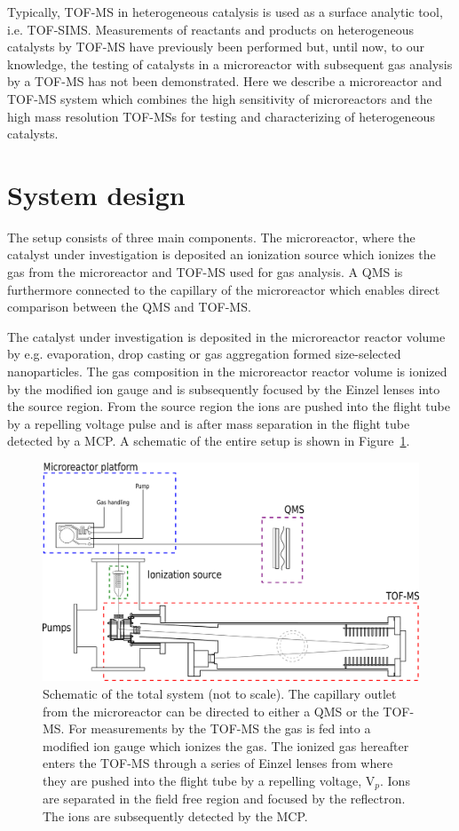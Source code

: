 \documentclass[aip,rsi]{revtex4-1}
\begin{document}
Typically, TOF-MS in heterogeneous catalysis is used as a surface analytic tool, i.e. TOF-SIMS\cite{Benninghoven1994,DeSmet1998,Grams2004,Johnson2010}. Measurements of reactants and products on heterogeneous catalysts by TOF-MS have previously been performed\cite{Levy1963,Okumura2007} but, until now, to our knowledge, the testing of catalysts in a microreactor with subsequent gas analysis by a TOF-MS has not been demonstrated. Here we describe a microreactor and TOF-MS system which combines the high sensitivity of microreactors and the high mass resolution TOF-MSs for testing and characterizing of heterogeneous catalysts.

\section{System design}
The setup consists of three main components. The microreactor, where the catalyst under investigation is deposited an ionization source which ionizes the gas from the microreactor and TOF-MS used for gas analysis. A QMS is furthermore connected to the capillary of the microreactor which enables direct comparison between the QMS and TOF-MS.

The catalyst under investigation is deposited in the microreactor reactor volume by e.g. evaporation\cite{Henriksen2009}, drop casting\cite{Vesborg2010} or gas aggregation formed size-selected nanoparticles. The gas composition in the microreactor reactor volume is ionized by the modified ion gauge  and is subsequently focused by the Einzel lenses into the source region. From the source region the ions are pushed into the flight tube by a repelling voltage pulse and is after mass separation in the flight tube detected by a MCP. A schematic of the entire setup is shown in Figure~\ref{fig:TOF_microreactor}.
\begin{figure}
 \includegraphics[width=14cm]{TOF_microreactor.png}%
 \caption{Schematic of the total system (not to scale). The capillary outlet from the microreactor can be directed to either a QMS or the TOF-MS. For measurements by the TOF-MS the gas is fed into a modified ion gauge which ionizes the gas. The ionized gas hereafter enters the TOF-MS through a series of Einzel lenses from where they are pushed into the flight tube by a repelling voltage, V$_p$. Ions are separated in the field free region and focused by the reflectron. The ions are subsequently detected by the MCP.\label{fig:TOF_microreactor}}%
\end{figure}
\end{document}

